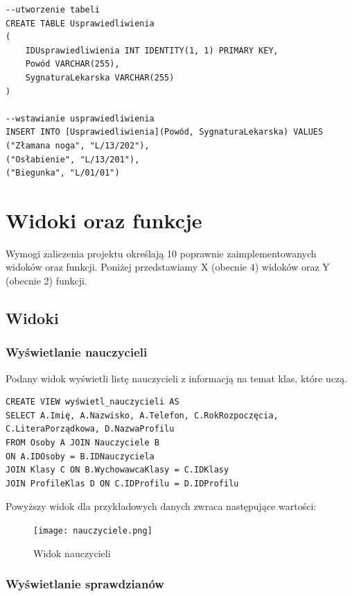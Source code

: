 \documentclass[60pt]{article}
\begin{document}
\begin{verbatim}
--utworzenie tabeli
CREATE TABLE Usprawiedliwienia
(
	IDUsprawiedliwienia INT IDENTITY(1, 1) PRIMARY KEY,
	Powód VARCHAR(255),
	SygnaturaLekarska VARCHAR(255)
)

--wstawianie usprawiedliwienia 
INSERT INTO [Usprawiedliwienia](Powód, SygnaturaLekarska) VALUES
("Złamana noga", "L/13/202"),
("Osłabienie", "L/13/201"), 
("Biegunka", "L/01/01")
\end{verbatim}

\newpage

\section{Widoki oraz funkcje}

Wymogi zaliczenia projektu określają 10 poprawnie zaimplementowanych widoków oraz funkcji. Poniżej przedstawiamy X (obecnie 4) widoków oraz Y (obecnie 2) funkcji.

\subsection{Widoki}

\subsubsection{Wyświetlanie nauczycieli}

Podany widok wyświetli listę nauczycieli z informacją na temat klas, które uczą. 

\begin{verbatim}
CREATE VIEW wyświetl_nauczycieli AS
SELECT A.Imię, A.Nazwisko, A.Telefon, C.RokRozpoczęcia, C.LiteraPorządkowa, D.NazwaProfilu
FROM Osoby A JOIN Nauczyciele B
ON A.IDOsoby = B.IDNauczyciela
JOIN Klasy C ON B.WychowawcaKlasy = C.IDKlasy
JOIN ProfileKlas D ON C.IDProfilu = D.IDProfilu
\end{verbatim}

Powyższy widok dla przykładowych danych zwraca następujące wartości:

\begin{figure}[h]
  \texttt{[image: nauczyciele.png]}
  \caption{Widok nauczycieli}
  \label{Widok nauczycieli}
\end{figure}

\subsubsection{Wyświetlanie sprawdzianów}
\end{document}

